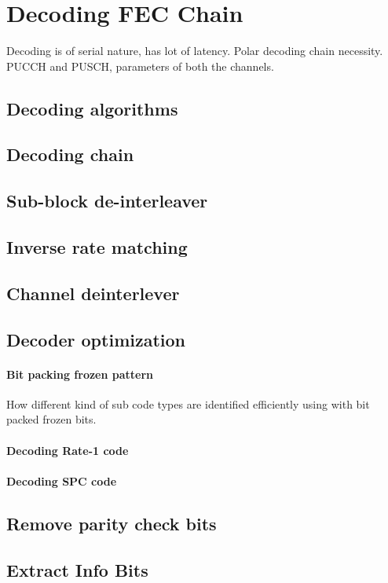 \chapter{Decoding FEC Chain} \label{chap:decoder}


Decoding is of serial nature, has lot of latency. Polar decoding chain necessity. PUCCH and PUSCH, parameters of both the channels.

\section{Decoding algorithms}


\section{Decoding chain}


\section{Sub-block de-interleaver}


\section{Inverse rate matching}

\section{Channel deinterlever}

\section{Decoder optimization}

\subsubsection{Bit packing frozen pattern}
How different kind of sub code types are identified efficiently using with bit packed frozen bits.

\subsubsection{Decoding Rate-1 code}

\subsubsection{Decoding SPC code}

\section{Remove parity check bits}

\section{Extract Info Bits}

